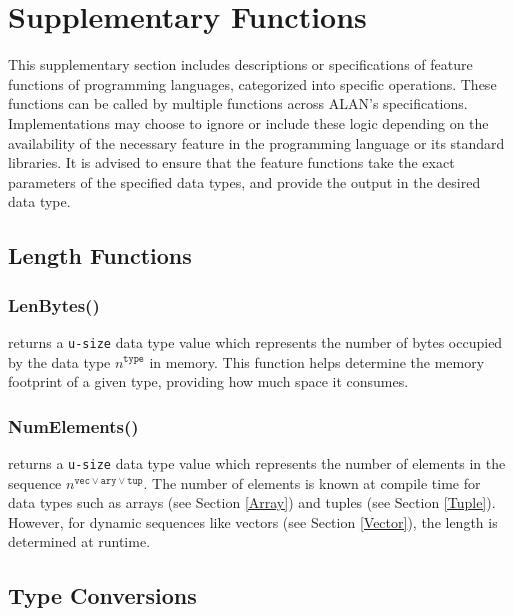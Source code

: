 \documentclass[../alan-handbook.tex]{subfiles}
\begin{document}
\section{Supplementary Functions} \label{SupplementaryFunctions}

This supplementary section includes descriptions or specifications of feature functions of programming languages, categorized into specific operations. These functions can be called by multiple functions across ALAN's specifications. Implementations may choose to ignore or include these logic depending on the availability of the necessary feature in the programming language or its standard libraries. It is advised to ensure that the feature functions take the exact parameters of the specified data types, and provide the output in the desired data type. 

\subsection{Length Functions} \label{SupplementaryLengthFunctions}

\subsubsection{LenBytes()} \label{LenBytes}

 returns a \texttt{u-size} data type value which represents the number of bytes occupied by the data type $n^{\texttt{type}}$ in memory. This function helps determine the memory footprint of a given type, providing how much space it consumes.

\subsubsection{NumElements()} \label{NumElements}

 returns a \texttt{u-size} data type value which represents the number of elements in the sequence $n^{\texttt{vec} \vee \texttt{ary} \vee \texttt{tup}}$. The number of elements is known at compile time for data types such as arrays (see Section \ref{Array}) and tuples (see Section \ref{Tuple}). However, for dynamic sequences like vectors (see Section \ref{Vector}), the length is determined at runtime.

\subsection{Type Conversions} \label{SupplementaryTypeConversions}
\end{document}
